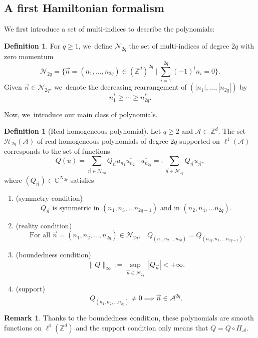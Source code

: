 \documentclass[10pt,a4paper]{amsart}
\let\ts\textstyle
\theoremstyle{plain}
\theoremstyle{definition}
\newtheorem{definition}[theorem]{Definition}
\newtheorem{remark}[theorem]{Remark}
\newcommand{\Z}{\mathbb{Z}}
\newcommand{\C}{\mathbb{C}}
\newcommand{\1}{\mathbf{1}}
\begin{document}
\subsection{A first Hamiltonian formalism} We first introduce a set of multi-indices to describe the polynomials:
\begin{definition}
\label{def:multi}
For $q\geq1$, we~define $\mathcal{N}_{2q}$ the set of multi-indices of degree $2q$ with zero momentum
\[
\ts
\mathcal{N}_{2q} = \big\{ \vec{n} = (n_{1},\dots,n_{2q})\in (\Z^d)^{2q}\mid \sum_{i=1}^{2q}(-1)^{i}n_{i}=0\big\}.
\]
Given $\vec{n}\in\mathcal{N}_{2q}$, we~denote the decreasing rearrangement of $(|n_{1}|,\dots,|n_{2q}|)$ by
\[
n_{1}^{\ast}\geq \cdots \geq n_{2q}^{\ast}.
\]
\end{definition}
Now, we~introduce our main class of polynomials.
\begin{definition}[Real homogeneous polynomial]
\label{def:hamb} Let $q\geq 2$ and $\mathcal{A} \subset \mathbb{Z}^d$. The set $\mathcal{H}_{2q}(\mathcal{A})$ of real homogeneous polynomials of degree $2q$ supported on $ \ell^1(\mathcal{A})$ corresponds to the set of functions
\[
Q(u) = \sum_{\vec{n}\in\mathcal{N}_{2q}} Q_{\vec{n}}u_{n_{1}}\overline{u_{n_{2}}}\cdots \overline{u_{n_{2q}}}=:\sum_{\vec{n}\in\mathcal{N}_{2q}}Q_{\vec{n}}u_{\vec{n}},
\]
where $(Q_{\vec{n}})\in\C^{\mathcal{N}_{2q}}$ satisfies
\begin{enumerate}
\item
(symmetry condition)
\[
\text{$Q_{\vec{n}}$ is symmetric in $(n_{1},n_{3},\dots n_{2q-1})$ and in $(n_{2},n_{4},\dots n_{2q})$.}
\]

\item
(reality condition)
\[
\text{ For all $\vec{n}=(n_{1},n_{2},\dots,n_{2q})\in\mathcal{N}_{2q}$,}\quad Q_{(n_{1},n_{2},\dots n_{2q})} = \overline{Q_{(n_{2q},n_{1},\dots n_{2q-1})}}.
\]

\item
(boundedness condition)
\[
\|Q\|_{\infty} := \underset{\vec{n}\in\mathcal{N}_{2q}}{\sup}\ |Q_{\vec{n}}| <+\infty.
\]

\item
(support)
\[
Q_{(n_{1},n_{2},\dots n_{2q})} \neq 0 \implies \vec{n} \in \mathcal{A}^{2q}.
\]
\end{enumerate}
\end{definition}
\begin{remark}
Thanks to the boundedness condition, these polynomials are smooth functions on $\ell^1(\mathbb{Z}^d)$ and the support condition only means that $Q = Q\circ \Pi_{\mathcal{A}}$.
\end{remark}
\end{document}
